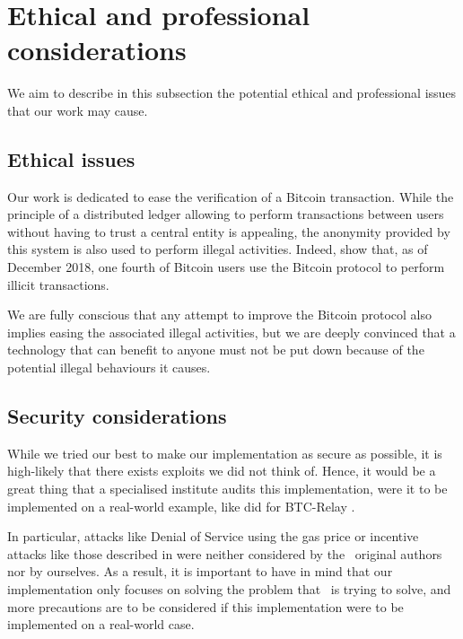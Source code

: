     \section{Ethical and professional considerations}
        We aim to describe in this subsection the potential ethical and professional issues that our work may cause.
        
        \subsection{Ethical issues}
            Our work is dedicated to ease the verification of a Bitcoin transaction. While the principle of a distributed ledger allowing to perform transactions between users without having to trust a central entity is appealing, the anonymity provided by this system is also used to perform illegal activities. Indeed, \citeauthor{BitcoinIllegal} show that, as of December 2018, one fourth of Bitcoin users use the Bitcoin protocol to perform illicit transactions.
            
            We are fully conscious that any attempt to improve the Bitcoin protocol also implies easing the associated illegal activities, but we are deeply convinced that a technology that can benefit to anyone must not be put down because of the potential illegal behaviours it causes.
        
        \subsection{Security considerations}
            While we tried our best to make our implementation as secure as possible, it is high-likely that there exists exploits we did not think of. Hence, it would be a great thing that a specialised institute audits this implementation, were it to be implemented on a real-world example, like \citeauthor{BTCAudit} did for BTC-Relay \cite{BTCAudit}.
            
            In particular, attacks like Denial of Service using the gas price or incentive attacks like those described in \cite{PayToWin} were neither considered by the \FC\ original authors nor by ourselves. As a result, it is important to have in mind that our implementation only focuses on solving the problem that \FC\ is trying to solve, and more precautions are to be considered if this implementation were to be implemented on a real-world case.
